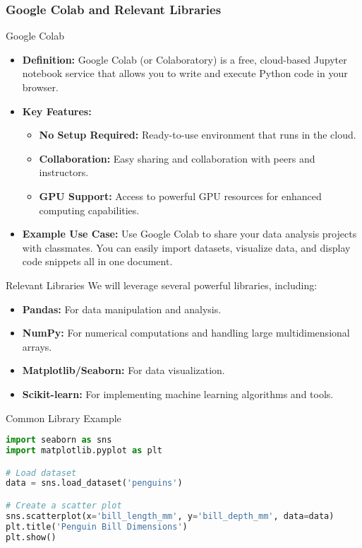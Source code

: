 \documentclass[aspectratio=169]{beamer}
\begin{document}
\begin{frame}[fragile]
  \frametitle{Google Colab and Relevant Libraries}
  \begin{block}{Google Colab}
    \begin{itemize}
      \item \textbf{Definition:} Google Colab (or Colaboratory) is a free, cloud-based Jupyter notebook service that allows you to write and execute Python code in your browser.
      \item \textbf{Key Features:}
      \begin{itemize}
        \item \textbf{No Setup Required:} Ready-to-use environment that runs in the cloud.
        \item \textbf{Collaboration:} Easy sharing and collaboration with peers and instructors.
        \item \textbf{GPU Support:} Access to powerful GPU resources for enhanced computing capabilities.
      \end{itemize}
      \item \textbf{Example Use Case:} Use Google Colab to share your data analysis projects with classmates. You can easily import datasets, visualize data, and display code snippets all in one document.
    \end{itemize}
  \end{block}
  
  \begin{block}{Relevant Libraries}
    We will leverage several powerful libraries, including:
    \begin{itemize}
      \item \textbf{Pandas:} For data manipulation and analysis.
      \item \textbf{NumPy:} For numerical computations and handling large multidimensional arrays.
      \item \textbf{Matplotlib/Seaborn:} For data visualization.
      \item \textbf{Scikit-learn:} For implementing machine learning algorithms and tools.
    \end{itemize}
  \end{block}

  \begin{block}{Common Library Example}
    \begin{lstlisting}[language=python]
import seaborn as sns
import matplotlib.pyplot as plt

# Load dataset
data = sns.load_dataset('penguins')

# Create a scatter plot
sns.scatterplot(x='bill_length_mm', y='bill_depth_mm', data=data)
plt.title('Penguin Bill Dimensions')
plt.show()
    \end{lstlisting}
  \end{block}
\end{frame}
\end{document}
